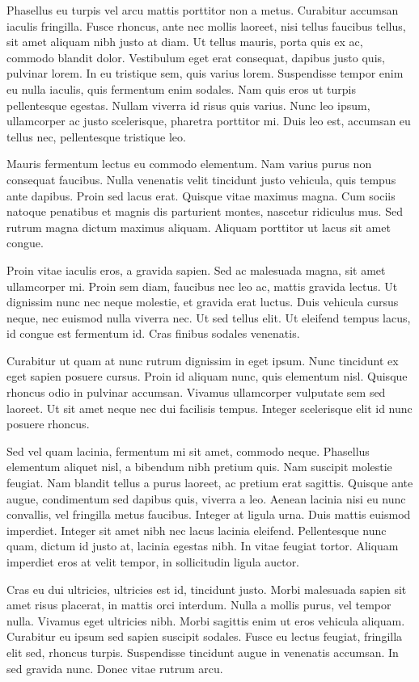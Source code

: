 Phasellus eu turpis vel arcu mattis porttitor non a metus. Curabitur accumsan iaculis fringilla. Fusce rhoncus, ante nec mollis laoreet, nisi tellus faucibus tellus, sit amet aliquam nibh justo at diam. Ut tellus mauris, porta quis ex ac, commodo blandit dolor. Vestibulum eget erat consequat, dapibus justo quis, pulvinar lorem. In eu tristique sem, quis varius lorem. Suspendisse tempor enim eu nulla iaculis, quis fermentum enim sodales. Nam quis eros ut turpis pellentesque egestas. Nullam viverra id risus quis varius. Nunc leo ipsum, ullamcorper ac justo scelerisque, pharetra porttitor mi. Duis leo est, accumsan eu tellus nec, pellentesque tristique leo.

Mauris fermentum lectus eu commodo elementum. Nam varius purus non consequat faucibus. Nulla venenatis velit tincidunt justo vehicula, quis tempus ante dapibus. Proin sed lacus erat. Quisque vitae maximus magna. Cum sociis natoque penatibus et magnis dis parturient montes, nascetur ridiculus mus. Sed rutrum magna dictum maximus aliquam. Aliquam porttitor ut lacus sit amet congue.

Proin vitae iaculis eros, a gravida sapien. Sed ac malesuada magna, sit amet ullamcorper mi. Proin sem diam, faucibus nec leo ac, mattis gravida lectus. Ut dignissim nunc nec neque molestie, et gravida erat luctus. Duis vehicula cursus neque, nec euismod nulla viverra nec. Ut sed tellus elit. Ut eleifend tempus lacus, id congue est fermentum id. Cras finibus sodales venenatis.

Curabitur ut quam at nunc rutrum dignissim in eget ipsum. Nunc tincidunt ex eget sapien posuere cursus. Proin id aliquam nunc, quis elementum nisl. Quisque rhoncus odio in pulvinar accumsan. Vivamus ullamcorper vulputate sem sed laoreet. Ut sit amet neque nec dui facilisis tempus. Integer scelerisque elit id nunc posuere rhoncus.

Sed vel quam lacinia, fermentum mi sit amet, commodo neque. Phasellus elementum aliquet nisl, a bibendum nibh pretium quis. Nam suscipit molestie feugiat. Nam blandit tellus a purus laoreet, ac pretium erat sagittis. Quisque ante augue, condimentum sed dapibus quis, viverra a leo. Aenean lacinia nisi eu nunc convallis, vel fringilla metus faucibus. Integer at ligula urna. Duis mattis euismod imperdiet. Integer sit amet nibh nec lacus lacinia eleifend. Pellentesque nunc quam, dictum id justo at, lacinia egestas nibh. In vitae feugiat tortor. Aliquam imperdiet eros at velit tempor, in sollicitudin ligula auctor.

Cras eu dui ultricies, ultricies est id, tincidunt justo. Morbi malesuada sapien sit amet risus placerat, in mattis orci interdum. Nulla a mollis purus, vel tempor nulla. Vivamus eget ultricies nibh. Morbi sagittis enim ut eros vehicula aliquam. Curabitur eu ipsum sed sapien suscipit sodales. Fusce eu lectus feugiat, fringilla elit sed, rhoncus turpis. Suspendisse tincidunt augue in venenatis accumsan. In sed gravida nunc. Donec vitae rutrum arcu.

